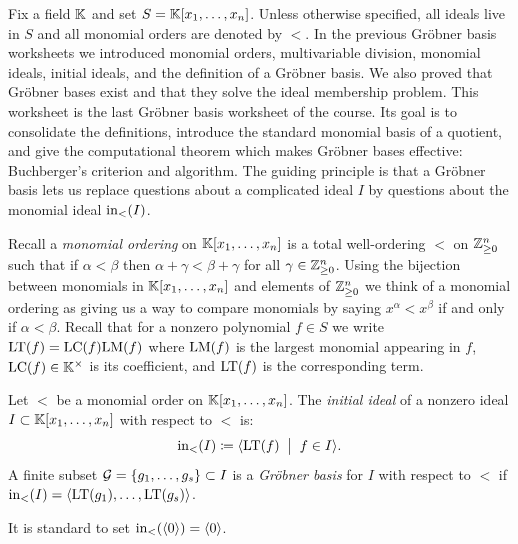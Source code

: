 \documentclass[Notebook.tex]{subfiles}
\begin{document}
\ifSubfilesClassLoaded{}{}


Fix a field $\mathbb K$ and set $S=\mathbb K[x_1,\ldots,x_n]$. Unless otherwise specified, all ideals live in $S$ and all monomial orders are denoted by $<$. In the previous Gr\"obner basis worksheets we introduced monomial orders, multivariable division, monomial ideals, initial ideals, and the definition of a Gr\"obner basis. We also proved that Gr\"obner bases exist and that they solve the ideal membership problem. This worksheet is the last Gr\"obner basis worksheet of the course. Its goal is to consolidate the definitions, introduce the standard monomial basis of a quotient, and give the computational theorem which makes Gr\"obner bases effective: Buchberger's criterion and algorithm. The guiding principle is that a Gr\"obner basis lets us replace questions about a complicated ideal $I$ by questions about the monomial ideal $\text{in}_<(I)$.

Recall a \emph{monomial ordering} on $\mathbb K[x_1,\ldots,x_n]$ is a total well-ordering $<$ on $\mathbb Z^{n}_{\geq0}$ such that if $\alpha < \beta$ then $\alpha + \gamma < \beta+\gamma$ for all $\gamma \in \mathbb Z^{n}_{\geq0}$. Using the bijection between monomials in $\mathbb K[x_1,\ldots,x_n]$  and elements of $\mathbb Z^{n}_{\geq0}$ we think of a monomial ordering as giving us a way to compare monomials by saying $x^{\alpha} < x^{\beta}$ if and only if $\alpha < \beta$. Recall that for a nonzero polynomial $f\in S$ we write $\text{LT}(f)=\text{LC}(f)\text{LM}(f)$ where $\text{LM}(f)$ is the largest monomial appearing in $f$, $\text{LC}(f)\in \mathbb K^{\times}$ is its coefficient, and $\text{LT}(f)$ is the corresponding term. 

\begin{definition}
Let $<$ be a monomial order on $\mathbb K[x_1,\ldots,x_n]$.  The \emph{initial ideal} of a nonzero ideal $I \subset \mathbb K[x_1,\ldots,x_n]$ with respect to $<$ is:
\[
\text{in}_{<}(I) \coloneqq \langle \text{LT}(f) \;\; \big| \;\; f \in I \rangle. 
\]
A finite subset $\mathcal{G} =\{g_1,\ldots,g_s\} \subset I$ is a \emph{Gr\"{o}bner basis} for $I$ with respect to $<$ if $\text{in}_{<}(I) = \langle \text{LT}(g_1), \ldots, \text{LT}(g_s)\rangle$.
\end{definition}

It is standard to set $\text{in}_{<}(\langle0\rangle)=\langle 0\rangle$. 

\hrulefill
\end{document}
